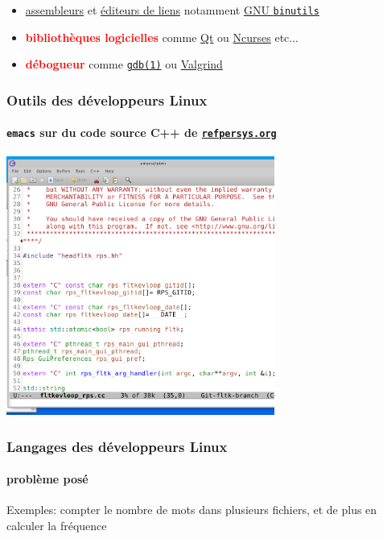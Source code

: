 \documentclass[xcolor=svgnames,final,smaller,a4]{beamer}
\begin{document}
\begin{frame}
\begin{relsize}{-1}
\begin{itemize}
    
    \item \href{https://fr.wikipedia.org/wiki/Programme_assembleur}{assembleurs} et \href{https://fr.wikipedia.org/wiki/Édition_de_liens}{éditeurs de liens} notamment \href{https://fr.wikipedia.org/wiki/GNU\_Binutils}{GNU \texttt{binutils}} 
    
    \item  \textbf{\textcolor{red}{bibliothèques logicielles}} comme \href{https://qt.io}{Qt} ou \href{https://fr.wikipedia.org/wiki/Ncurses}{Ncurses} etc...
      
    \item  \textbf{\textcolor{red}{débogueur}} comme 
    \href{https://man7.org/linux/man-pages/man1/gdb.1.html}{\texttt{gdb(1)}} ou \href{https://fr.wikipedia.org/wiki/Valgrind}{Valgrind}
      
  \end{itemize}
  \end{relsize}
\end{frame}

\begin{frame}
  \frametitle{Outils des développeurs Linux}
  \framesubtitle{\texttt{emacs} sur du code source C++ de \href{http://refpersys.org/}{\texttt{refpersys.org}}}

  \vspace{0.1cm}
  
    \includegraphics[width=0.66\textwidth]{emacs-refpersys} 
\end{frame}

\begin{frame}
  \frametitle{Langages des développeurs Linux}
  \framesubtitle{problème posé}

  Exemples: compter le nombre de mots dans plusieurs fichiers, et de plus en calculer la fréquence
\end{frame}
\end{document}

